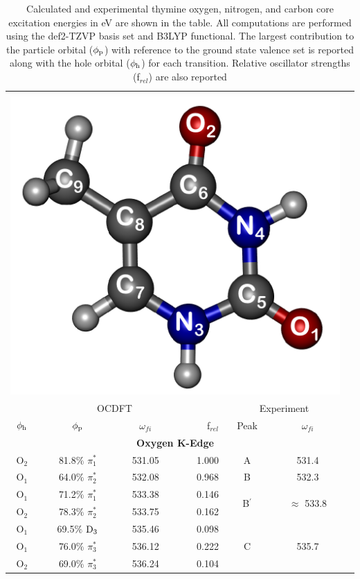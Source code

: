 \documentclass[12pt]{article}
\begin{document}
   \begin{table}[!t]
   \footnotesize
            \caption{Calculated and experimental thymine oxygen, nitrogen, and carbon core excitation energies in eV are shown in the table. All computations are performed using the def2-TZVP basis set and B3LYP functional. The largest contribution to the particle orbital ($\phi_{\rm p}$) with reference to the ground state valence set is reported along with the hole orbital ($\phi_{\rm h}$) for each transition. Relative oscillator strengths (f$_{rel}$) are also reported}
 \centering
     \begin{tabular*}{8.5cm}{@{\extracolsep{\fill} }cccrccc}
     \hline
     \hline\\[-8pt]
     \multicolumn{6}{c}{
 \includegraphics[width=3.cm]{ThymineNumbering.png}
 }\\
 \hline
   \multicolumn{4}{c}{OCDFT} &\multicolumn{2}{c}{Experiment} \\
 $\phi_{\rm h}$ &  $\phi_{\rm p}$ & $\omega_{fi}$ & f$_{rel}$ & Peak &  $\omega_{fi}$   \\[1pt]
   \hline
    \multicolumn{6}{c}{\textbf{Oxygen K-Edge}} \vspace{0.05in}\\
    O$_2$
 &   81.8$\%$ $\pi_1^*$  & 531.05 & 1.000 & A  & 531.4 \vspace{0.05in}\\
    O$_1$
 &   64.0$\%$ $\pi_2^*$  & 532.08 & 0.968 & B & 532.3 \vspace{0.05in}\\
    O$_1$
 &   71.2$\%$ $\pi_1^*$  & 533.38 & 0.146 & \multirow{2}{*}{B$^{\prime}$} & \multirow{2}{*}{$\approx$ 533.8}  \\
    O$_2$
 &   78.3$\%$ $\pi_2^*$  & 533.75 & 0.162 \vspace{0.05in}\\
    O$_1$
 &   69.5$\%$ $\rm D_3$  & 535.46 & 0.098   & \multirow{3}{*}{C} & \multirow{3}{*}{535.7}  \\
    O$_1$
 &   76.0$\%$ $\pi_3^*$  & 536.12 & 0.222 \\
    O$_2$
 &   69.0$\%$ $\pi_3^*$  & 536.24 & 0.104 \vspace{0.05in}\\

\end{tabular*}
\end{table}
\end{document}
